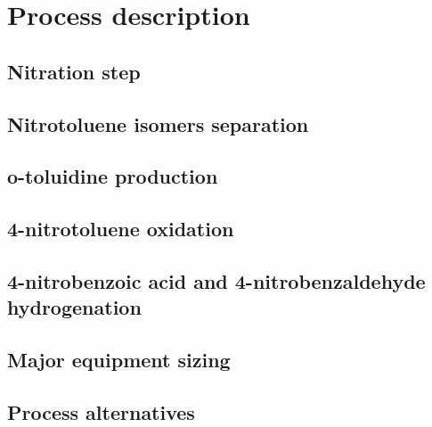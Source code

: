 \section{Process description}
\label{sec:process}
\subsection{Nitration step}

\subsection{Nitrotoluene isomers separation}



\subsection{o-toluidine production}

\subsection{4-nitrotoluene oxidation}

\subsection{4-nitrobenzoic acid and 4-nitrobenzaldehyde hydrogenation}


\subsection{Major equipment sizing}


\subsection{Process alternatives}



